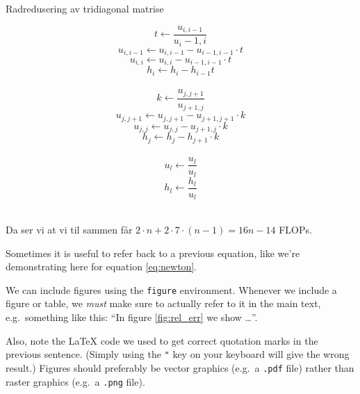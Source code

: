 \documentclass[english,notitlepage]{revtex4-1}  %
\begin{document}
\begin{algorithm}[H]
	\caption{Radredusering av tridiagonal matrise}\label{algo:midpoint_rule}
	\begin{algorithmic}
		 
		\State $$t\leftarrow \frac{u_{i,i-1}}{u{_i-1,i}}$$ 
		$$
		u_{i,i-1}\leftarrow u_{i,i-1}-u_{i-1,i-1} \cdot t
		$$ 
		$$
		u_{i,i}\leftarrow u_{i,i}-u_{i-1,i-1}\cdot t
		$$ 
		$$
		h_i\leftarrow h_i-h_{i-1} t
		$$  \\
		\EndFor
		 
		\State $$k\leftarrow \frac{u_{j,j+1}}{u_{j+1,j}}$$ 
		$$
		u_{j,j+1}\leftarrow u_{j,j+1}-u_{j+1,j+1}\cdot k
		$$ 
		$$
		u_{j,j}\leftarrow u_{j,j}-u_{j+1,j}\cdot k
		$$ 
		$$
		h_j\leftarrow h_j-h_{j+1}\cdot k
		$$  \\
		\EndFor
		 
		\State $$
		u_l \leftarrow \frac{u_l}{u_l}$$ 
		$$
		h_l\leftarrow \frac{h_l}{u_l}
		$$  \\
		\EndFor
	\end{algorithmic}
\end{algorithm}
Da ser vi at vi til sammen får $2\cdot n+ 2\cdot 7\cdot (n-1)=16n-14$ FLOPs.









Sometimes it is useful to refer back to a previous equation, like we're demonstrating here for equation \ref{eq:newton}.

We can include figures using the \texttt{figure} environment. Whenever we include a figure or table, we \textit{must} make sure to actually refer to it in the main text, e.g.\ something like this: ``In figure \ref{fig:rel_err} we show \ldots''. 

Also, note the LaTeX code we used to get correct quotation marks in the previous sentence. (Simply using the \texttt{"} key on your keyboard will give the wrong result.) Figures should preferably be vector graphics (e.g.\ a \texttt{.pdf} file) rather than raster graphics (e.g.\ a \texttt{.png} file).
\end{document}
